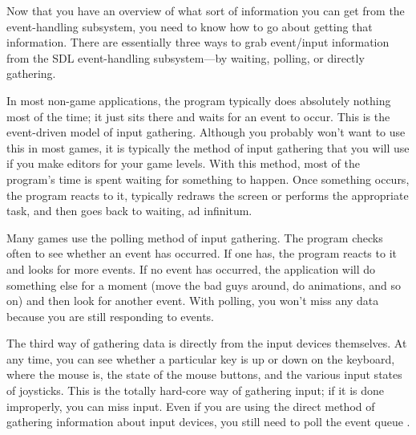 Now that you have an overview of what sort of information you can get from the event-handling subsystem, you need to know how to go about getting that information. There are essentially three ways to grab event/input information from the SDL event-handling subsystem—by waiting, polling, or directly gathering.

In most non-game applications, the program typically does absolutely nothing most of the time; it just sits there and waits for an event to occur. This is the event-driven model of input gathering. Although you probably won’t want to use this in most games, it is typically the method of input gathering that you will use if you make editors for your game levels.
With this method, most of the program’s time is spent waiting for something to happen. Once something occurs, the program reacts to it, typically redraws the screen or performs the appropriate task, and then goes back to waiting, ad infinitum.

Many games use the polling method of input gathering. The program checks often to see whether an event has occurred. If one has, the program reacts to it and looks for more events. If no event has occurred, the application will do something else for a moment (move the bad guys around, do animations, and so on) and then look for another event. With polling, you won’t miss any data because you are still responding to events.

The third way of gathering data is directly from the input devices themselves. At any time, you can see whether a particular key is up or down on the keyboard, where the mouse is, the state of the mouse buttons, and the various input states of joysticks. This is the totally hard-core way of gathering input; if it is done improperly, you can miss input.
Even if you are using the direct method of gathering information about input devices, you still need to poll the event queue \parencite{FocusOnSDL}.




